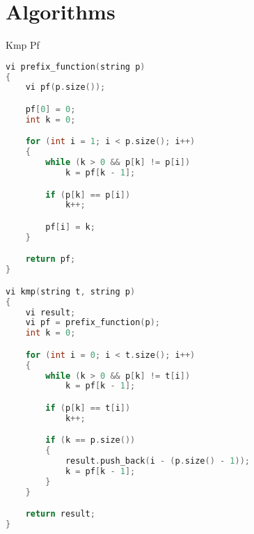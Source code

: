\documentclass[leter]{amsart}
\begin{document}
\section{Algorithms}
Kmp Pf
\begin{multicols}{2}
\begin{lstlisting}[language=C++]
vi prefix_function(string p)
{
    vi pf(p.size());

    pf[0] = 0;
    int k = 0;

    for (int i = 1; i < p.size(); i++)
    {
        while (k > 0 && p[k] != p[i])
            k = pf[k - 1];

        if (p[k] == p[i])
            k++;

        pf[i] = k;
    }

    return pf;
}

vi kmp(string t, string p)
{
    vi result;
    vi pf = prefix_function(p);
    int k = 0;

    for (int i = 0; i < t.size(); i++)
    {
        while (k > 0 && p[k] != t[i])
            k = pf[k - 1];

        if (p[k] == t[i])
            k++;

        if (k == p.size())
        {
            result.push_back(i - (p.size() - 1));
            k = pf[k - 1];
        }
    }

    return result;
}

\end{lstlisting}
\end{multicols}
\end{document}
